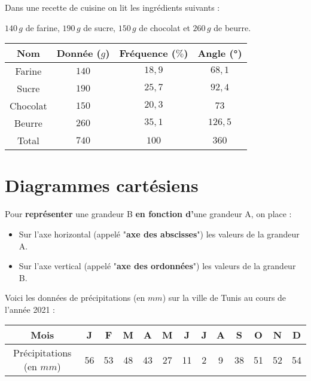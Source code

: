 \documentclass[a4paper,dvipsnames]{article}
\begin{document}
\begin{Ex}
Dans une recette de cuisine on lit les ingrédients suivants :

$140\,g$ de farine, $190\,g$ de sucre, $150\,g$ de chocolat et $260\,g$ de beurre.

\begin{tabular}{c|c|c|c}
Nom & Donnée ($g$) & Fréquence ($\%$) & Angle (°) \\\hline\hline
Farine & $140$ & $18,9$ & $68,1$ \\\hline
Sucre & $190$ & $25,7$ & $92,4$ \\\hline
Chocolat & $150$ & $20,3$ & $73$ \\\hline
Beurre & $260$ & $35,1$ & $126,5$ \\\hline
Total & $740$ & $100$ & $360$ \\
\end{tabular}
\end{Ex}

\section{Diagrammes cartésiens}

\begin{Def}
Pour \textbf{représenter} une grandeur B \textbf{en fonction d'}une grandeur A, on place :
\begin{itemize}
\item Sur l'axe horizontal (appelé "\textbf{axe des abscisses}") les valeurs de la grandeur A.
\item Sur l'axe vertical (appelé "\textbf{axe des ordonnées}") les valeurs de la grandeur B.
\end{itemize}
\end{Def}

\begin{Ex}
Voici les données de précipitations (en $mm$) sur la ville de Tunis au cours de l'année 2021 : 
\begin{center}
\begin{tabular}{c|c|c|c|c|c|c|c|c|c|c|c|c}
Mois & J & F & M & A & M & J & J & A & S & O & N & D \\\hline
Précipitations (en $mm$) & 56 & 53 & 48 & 43 & 27 & 11 & 2 & 9 & 38 & 51 & 52 & 54 \\
\end{tabular}
\end{center}
\end{Ex}
\end{document}
